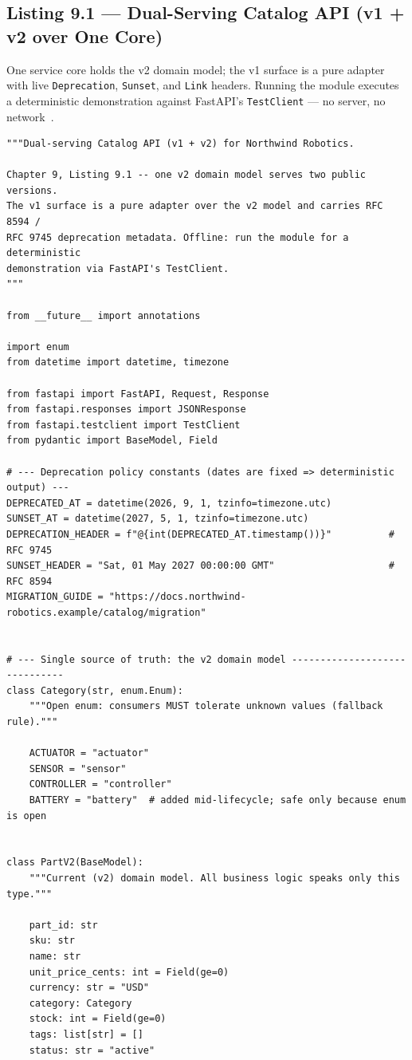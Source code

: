 \subsection{Listing 9.1 --- Dual-Serving Catalog API (v1 + v2 over One Core)}
\label{subsec:ch9-listing1}

One service core holds the v2 domain model; the v1 surface is a pure adapter
with live \texttt{Deprecation}, \texttt{Sunset}, and \texttt{Link} headers.
Running the module executes a deterministic demonstration against FastAPI's
\texttt{TestClient} --- no server, no network~\cite{fastapidocs}.

\begin{verbatim}
"""Dual-serving Catalog API (v1 + v2) for Northwind Robotics.

Chapter 9, Listing 9.1 -- one v2 domain model serves two public versions.
The v1 surface is a pure adapter over the v2 model and carries RFC 8594 /
RFC 9745 deprecation metadata. Offline: run the module for a deterministic
demonstration via FastAPI's TestClient.
"""

from __future__ import annotations

import enum
from datetime import datetime, timezone

from fastapi import FastAPI, Request, Response
from fastapi.responses import JSONResponse
from fastapi.testclient import TestClient
from pydantic import BaseModel, Field

# --- Deprecation policy constants (dates are fixed => deterministic output) ---
DEPRECATED_AT = datetime(2026, 9, 1, tzinfo=timezone.utc)
SUNSET_AT = datetime(2027, 5, 1, tzinfo=timezone.utc)
DEPRECATION_HEADER = f"@{int(DEPRECATED_AT.timestamp())}"          # RFC 9745
SUNSET_HEADER = "Sat, 01 May 2027 00:00:00 GMT"                    # RFC 8594
MIGRATION_GUIDE = "https://docs.northwind-robotics.example/catalog/migration"


# --- Single source of truth: the v2 domain model ------------------------------
class Category(str, enum.Enum):
    """Open enum: consumers MUST tolerate unknown values (fallback rule)."""

    ACTUATOR = "actuator"
    SENSOR = "sensor"
    CONTROLLER = "controller"
    BATTERY = "battery"  # added mid-lifecycle; safe only because enum is open


class PartV2(BaseModel):
    """Current (v2) domain model. All business logic speaks only this type."""

    part_id: str
    sku: str
    name: str
    unit_price_cents: int = Field(ge=0)
    currency: str = "USD"
    category: Category
    stock: int = Field(ge=0)
    tags: list[str] = []
    status: str = "active"



\end{verbatim}
